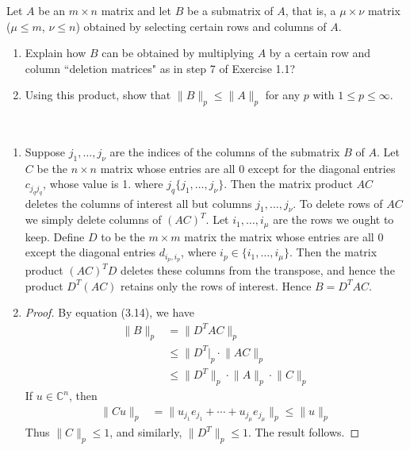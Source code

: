 \documentclass[12pt]{article}
\newenvironment{ex}[2][Exercise]{\begin{trivlist}
		\item[\hskip \labelsep {\bfseries #1}\hskip \labelsep {\bfseries #2.}]}{\end{trivlist}}
\newenvironment{sol}[1][Solution]{\begin{trivlist}
		\item[\hskip \labelsep {\bfseries #1:}]}{\end{trivlist}}
\begin{document}
\begin{ex}{4}
	Let $A$ be an $m\times n$ matrix and let $B$ be a submatrix of $A$, that is, a $\mu\times \nu$
	matrix ($\mu\leq m$, $\nu\leq n$) obtained by selecting certain rows and columns of $A$.
	\begin{enumerate}[label=(\alph*)]
		\item Explain how $B$ can be obtained by multiplying $A$ by a certain row and column
		``deletion matrices" as in step 7 of Exercise 1.1?
		\item Using this product, show that $\lVert B\rVert_p\leq \lVert A\rVert_p$ for any $p$ with
		$1\leq p\leq \infty$.
	\end{enumerate}
\end{ex}

\begin{sol}
	\
	\begin{enumerate}[label=(\alph*)]
		\item Suppose $j_1,\ldots,j_{\nu}$ are the indices of the columns of the submatrix $B$ of $A$.
		Let $C$ be the $n\times n$ matrix whose entries are all $0$ except for the diagonal entries
		$c_{j_q j_q}$, whose value is 1. where $j_q\{j_1,\ldots,j_{\nu}\}$. Then the matrix product $AC$
		deletes the columns of interest all but columns $j_1,\ldots,j_\nu$. To delete rows of $AC$
		we simply delete columns of $(AC)^T$. Let $i_1,\ldots,i_\mu$ are the rows we ought to keep.
		Define $D$ to be the $m\times m$ matrix the matrix whose entries are all 0 except the diagonal		
		entries $d_{i_p,i_p}$, where $i_p\in\{i_1,\ldots,i_\mu\}$. Then the matrix product $(AC)^TD$
		deletes these columns from the transpose, and hence the product $D^T(AC)$ retains only
		the rows of interest. Hence $B=D^TAC$.
		\item \begin{proof}
			By equation (3.14), we have
			\begin{align*}
				\lVert B\rVert_p&=\lVert D^T AC\rVert_p\\
				&\leq \lVert D^T\rvert_p\cdot \lVert AC\rVert_p\\
				&\leq \lVert D^T\rVert_p \cdot \lVert A\rVert_p\cdot \lVert C\rVert_p
			\end{align*}
			If $u\in\mathbb{C}^n$, then
			\begin{align*}
				\lVert Cu\rVert_p &= \lVert u_{j_1}e_{j_1}+\cdots+u_{j_\mu}e_{j_\mu}\rVert_p\leq \lVert u\rVert_p
			\end{align*}
			Thus $\lVert C\rVert_p\leq 1$, and similarly, $\lVert D^T\rVert_p\leq 1$. The result follows.
		\end{proof}
	\end{enumerate}
\end{sol}
\end{document}
